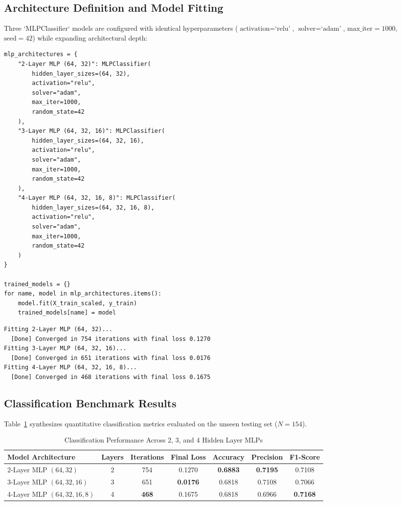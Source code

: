 \documentclass[12pt]{article}
\begin{document}
\subsection{Architecture Definition and Model Fitting}
Three `MLPClassifier` models are configured with identical hyperparameters ($\text{activation}=\text{`relu'}$, $\text{solver}=\text{`adam'}$, $\text{max\_iter}=1000$, $\text{seed}=42$) while expanding architectural depth:

\begin{lstlisting}[style=code]
mlp_architectures = {
    "2-Layer MLP (64, 32)": MLPClassifier(
        hidden_layer_sizes=(64, 32),
        activation="relu",
        solver="adam",
        max_iter=1000,
        random_state=42
    ),
    "3-Layer MLP (64, 32, 16)": MLPClassifier(
        hidden_layer_sizes=(64, 32, 16),
        activation="relu",
        solver="adam",
        max_iter=1000,
        random_state=42
    ),
    "4-Layer MLP (64, 32, 16, 8)": MLPClassifier(
        hidden_layer_sizes=(64, 32, 16, 8),
        activation="relu",
        solver="adam",
        max_iter=1000,
        random_state=42
    )
}

trained_models = {}
for name, model in mlp_architectures.items():
    model.fit(X_train_scaled, y_train)
    trained_models[name] = model
\end{lstlisting}

\begin{lstlisting}[style=output]
Fitting 2-Layer MLP (64, 32)...
  [Done] Converged in 754 iterations with final loss 0.1270
Fitting 3-Layer MLP (64, 32, 16)...
  [Done] Converged in 651 iterations with final loss 0.0176
Fitting 4-Layer MLP (64, 32, 16, 8)...
  [Done] Converged in 468 iterations with final loss 0.1675
\end{lstlisting}

\subsection{Classification Benchmark Results}
Table~\ref{tab:clf_results} synthesizes quantitative classification metrics evaluated on the unseen testing set ($N=154$).

\begin{table}[H]
\centering
\caption{Classification Performance Across 2, 3, and 4 Hidden Layer MLPs}
\label{tab:clf_results}
\vspace{0.2cm}
\begin{tabular}{lcccccc}
\toprule
\textbf{Model Architecture} & \textbf{Layers} & \textbf{Iterations} & \textbf{Final Loss} & \textbf{Accuracy} & \textbf{Precision} & \textbf{F1-Score} \\
\midrule
2-Layer MLP $(64, 32)$          & 2 & 754 & 0.1270 & \textbf{0.6883} & \textbf{0.7195} & 0.7108 \\
3-Layer MLP $(64, 32, 16)$      & 3 & 651 & \textbf{0.0176} & 0.6818 & 0.7108 & 0.7066 \\
4-Layer MLP $(64, 32, 16, 8)$   & 4 & \textbf{468} & 0.1675 & 0.6818 & 0.6966 & \textbf{0.7168} \\
\bottomrule
\end{tabular}
\end{table}
\end{document}
